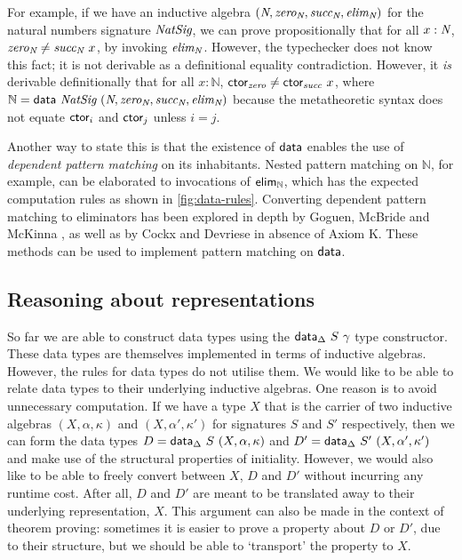 For example, if we have an inductive algebra $(\textit{N}, \textit{zero}_{\textit{N}},
\textit{succ}_{\textit{N}}, \textit{elim}_{\textit{N}})$ for the natural numbers signature
$\textit{NatSig}$, we can prove propositionally that for all $x : \textit{N}$,
$\textit{zero}_{\textit{N}} \neq \textit{succ}_{\textit{N}}\ x$, by invoking $\textit{elim}_{\textit{N}}$.
However, the typechecker does not know this fact; it is not derivable as a
definitional equality contradiction. However, it \emph{is} derivable
definitionally that for all $x : \mathbb{N}$, $\textsf{ctor}_{\textit{zero}} \neq
\textsf{ctor}_{\textit{succ}}\ x$, where $\mathbb{N} = \textsf{data}\ {\textit{NatSig}}\ (\textit{N},
\textit{zero}_{\textit{N}}, \textit{succ}_{\textit{N}}, \textit{elim}_{\textit{N}})$ because the
metatheoretic syntax does not equate $\textsf{ctor}_i$ and
$\textsf{ctor}_j$ unless $i = j$.

Another way to state this is that the existence of $\textsf{data}$ enables the use of
\emph{dependent pattern matching} on its inhabitants. Nested pattern matching on
$\mathbb{N}$, for example, can be elaborated to invocations of
$\textsf{elim}_{\mathbb{N}}$, which has the expected computation rules as shown in
\cref{fig:data-rules}. Converting dependent pattern matching to eliminators has
been explored in depth by Goguen, McBride and McKinna \cite{Goguen2006-sy}, as
well as by Cockx and Devriese \cite{Cockx2018-bv} in absence of Axiom K. These
methods can be used to implement pattern matching on $\textsf{data}$.

\subsection{Reasoning about representations} \label{sub:lambdadata}

So far we are able to construct data types using the $\textsf{data}_\Delta\ S\ \gamma$
type constructor. These data types are themselves implemented in terms of
inductive algebras. However, the rules for data types do not utilise them. We
would like to be able to relate data types to their underlying inductive
algebras. One reason is to avoid unnecessary
computation. If we have a type $X$ that is the carrier of two inductive algebras
$(X, \alpha, \kappa)$ and $(X, \alpha', \kappa')$ for signatures $S$ and
$S'$ respectively, then we can form the data types $D = \textsf{data}_\Delta\ S\ (X,
\alpha, \kappa)$ and $D' = \textsf{data}_\Delta\ {S'}\ (X, \alpha', \kappa')$ and make
use of the structural properties of initiality. However, we would also like to
be able to freely convert between $X$, $D$ and $D'$ without incurring any
runtime cost. After all, $D$ and $D'$ are meant to be translated away to their
underlying representation, $X$. This argument can also be made in the context of
theorem proving: sometimes it is easier to prove a property about $D$ or $D'$,
due to their structure, but we should be able to `transport' the property to
$X$.

